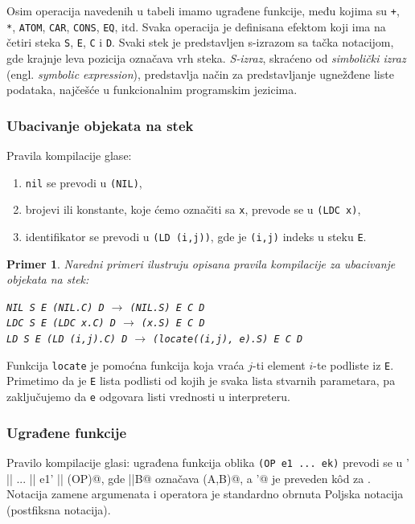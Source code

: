 \documentclass[a4paper]{article}
\newtheorem{primer}{Primer}[section]
\begin{document}
Osim operacija navedenih u tabeli imamo ugrađene funkcije, među kojima su \verb|+|, \verb|*|, \verb|ATOM|, \verb|CAR|, \verb|CONS|, \verb|EQ|, itd. Svaka operacija je definisana efektom koji ima na četiri steka \verb|S|, \verb|E|, \verb|C| i \verb|D|. Svaki stek je predstavljen s-izrazom sa tačka notacijom, gde krajnje leva pozicija označava vrh steka. \textit{S-izraz}, skraćeno od \textit{simbolički izraz} (engl. \textit{symbolic expression}), predstavlja način za predstavljanje ugnežđene liste podataka, najčešće u funkcionalnim programskim jezicima.

\subsubsection{Ubacivanje objekata na stek}

Pravila kompilacije glase:

\begin{enumerate}
	\item \verb|nil| se prevodi u \verb|(NIL)|,
	\item brojevi ili konstante, koje ćemo označiti sa \verb|x|, prevode se u \verb|(LDC x)|,
	\item identifikator se prevodi u \verb|(LD (i,j))|, gde je \verb|(i,j)| indeks u steku \verb|E|.
\end{enumerate}

\begin{primer} Naredni primeri ilustruju opisana pravila kompilacije za ubacivanje objekata na stek:
	\begin{center}
		\verb|NIL S E (NIL.C) D| $\rightarrow$ \verb|(NIL.S) E C D|\\
		\verb|LDC S E (LDC x.C) D| $\rightarrow$ \verb|(x.S) E C D|\\
		\verb|LD S E (LD (i,j).C) D| $\rightarrow$ \verb|(locate((i,j), e).S) E C D|
	\end{center}
\end{primer}

Funkcija \verb|locate| je pomoćna funkcija koja vraća $j$-ti element $i$-te podliste iz \verb|E|. Primetimo da je \verb|E| lista podlisti od kojih je svaka lista stvarnih parametara, pa zaključujemo da \verb|e| odgovara listi vrednosti u interpreteru.

\subsubsection{Ugrađene funkcije}

Pravilo kompilacije glasi: ugrađena funkcija oblika \verb|(OP e1 ... ek)| prevodi se u \verb@ek' || ... || e1' || (OP)@, gde \verb@A||B@ označava \verb@append(A,B)@, a \verb@ei'@ je preveden k\^od za \verb@ei@. Notacija zamene argumenata i operatora je standardno obrnuta Poljska notacija (postfiksna notacija).
\end{document}
